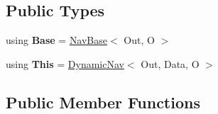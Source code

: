 \subsection*{Public Types}
\begin{DoxyCompactItemize}
\item 
\mbox{\label{classDynamicNav_a5ac8cf2128d1b0319f9a85e18c20faa9}} 
using {\bfseries Base} = \hyperlink{classNavBase}{Nav\+Base}$<$ Out, O $>$
\item 
\mbox{\label{classDynamicNav_aa37a77b2e60b061ad1f53292a5797c47}} 
using {\bfseries This} = \hyperlink{classDynamicNav}{Dynamic\+Nav}$<$ Out, Data, O $>$
\end{DoxyCompactItemize}
\subsection*{Public Member Functions}
